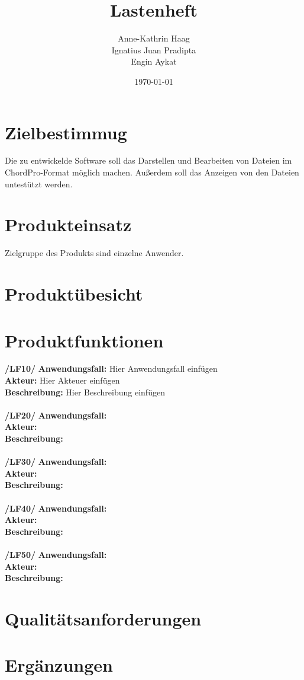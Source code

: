 \documentclass[pdflatex, a4paper, oneside]{scrartcl}
\author{Anne-Kathrin Haag\\Ignatius Juan Pradipta\\Engin Aykat} \title{Lastenheft} \date{\today}
\begin{document}
	\maketitle
	\pagebreak
	
	\section{Zielbestimmug}
		Die zu entwickelde Software soll das Darstellen und Bearbeiten von Dateien im ChordPro-Format möglich machen. Außerdem soll das Anzeigen von den Dateien untestützt werden.
	\section{Produkteinsatz}
		Zielgruppe des Produkts sind einzelne Anwender.
	\section{Produktübesicht}
		
	\section{Produktfunktionen}
		\textbf{/LF10/} \indent \textbf{Anwendungsfall: }Hier Anwendungsfall einfügen\\
		\indent \indent \indent \indent \indent \textbf{Akteur: }Hier Akteuer einfügen\\
		\indent \indent \indent \indent \indent \textbf{Beschreibung: }Hier Beschreibung einfügen\\
		\\
		\textbf{/LF20/} \indent \textbf{Anwendungsfall: }\\
		\indent \indent \indent \indent \indent \textbf{Akteur: }\\
		\indent \indent \indent \indent \indent \textbf{Beschreibung: }\\
		\\
		\textbf{/LF30/} \indent \textbf{Anwendungsfall: }\\
		\indent \indent \indent \indent \indent \textbf{Akteur: }\\
		\indent \indent \indent \indent \indent \textbf{Beschreibung: }\\
		\\
		\textbf{/LF40/} \indent \textbf{Anwendungsfall: }\\
		\indent \indent \indent \indent \indent \textbf{Akteur: }\\
		\indent \indent \indent \indent \indent \textbf{Beschreibung: }\\
		\\
		\textbf{/LF50/} \indent \textbf{Anwendungsfall: }\\
		\indent \indent \indent \indent \indent \textbf{Akteur: }\\
		\indent \indent \indent \indent \indent \textbf{Beschreibung: }\\
	\section{Qualitätsanforderungen}
	\section{Ergänzungen}
	\pagebreak
\end{document}
